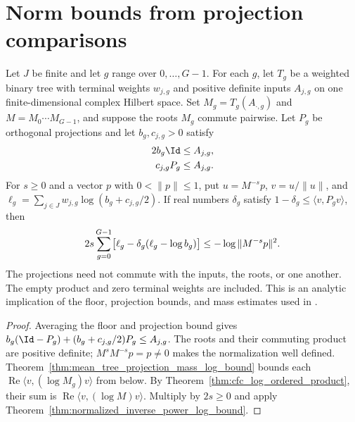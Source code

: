 \section{Norm bounds from projection comparisons}

\begin{theorem}
\label{thm:mean_tree_multiband_lower_norm}
\leanok
{}
Let $J$ be finite and let $g$ range over $0,\ldots,G-1$. For each $g$,
let $T_g$ be a weighted binary tree with terminal weights $w_{j,g}$ and
positive definite inputs $A_{j,g}$ on one finite-dimensional complex
Hilbert space. Set $M_g=T_g(A_{\cdot,g})$ and $M=M_0\cdots M_{G-1}$,
and suppose the roots $M_g$ commute pairwise. Let $P_g$ be orthogonal
projections and let $b_g,c_{j,g}>0$ satisfy
\begin{align}
 2b_g\Id&\le A_{j,g},\notag\\
 c_{j,g}P_g&\le A_{j,g}.
 \notag
\end{align}
For $s\ge0$ and a vector $p$ with $0<\|p\|\le1$, put
$u=M^{-s}p$, $v=u/\|u\|$, and
$\ell_g=\sum_{j\in J}w_{j,g}\log(b_g+c_{j,g}/2)$.
If real numbers $\delta_g$ satisfy
$1-\delta_g\le\langle v,P_gv\rangle$, then
\begin{align}
 2s\sum_{g=0}^{G-1}
   \bigl[\ell_g-\delta_g(\ell_g-\log b_g)\bigr]
 \le-\log\|M^{-s}p\|^2.
 \notag
\end{align}
The projections need not commute with the inputs, the roots, or one
another. The empty product and zero terminal weights are included.
This is an analytic implication of the floor, projection bounds, and
mass estimates used in \cite[Section~8]{OpenAI2026AreaLaw}.
\end{theorem}

\begin{proof}
\leanok
{}
Averaging the floor and projection bound gives
$b_g(\Id-P_g)+(b_g+c_{j,g}/2)P_g\le A_{j,g}$.
The roots and their commuting product are positive definite;
$M^sM^{-s}p=p\ne0$ makes the normalization well defined.
Theorem~\ref{thm:mean_tree_projection_mass_log_bound} bounds each
$\operatorname{Re}\langle v,(\log M_g)v\rangle$ from below.
By Theorem~\ref{thm:cfc_log_ordered_product}, their sum is
$\operatorname{Re}\langle v,(\log M)v\rangle$.
Multiply by $2s\ge0$ and apply
Theorem~\ref{thm:normalized_inverse_power_log_bound}.
\end{proof}

